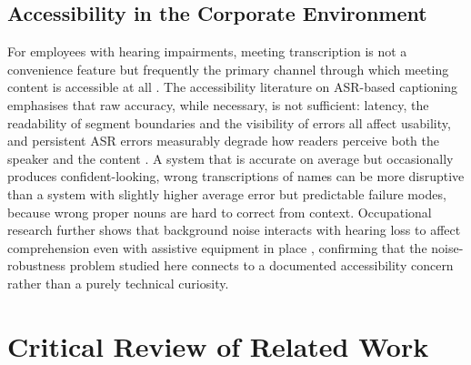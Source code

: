 \documentclass[12pt]{report}
\begin{document}
\subsection{Accessibility in the Corporate Environment}
For employees with hearing impairments, meeting transcription is not a convenience feature but frequently the primary channel through which meeting content is accessible at all \cite{marsja2025digital}. The accessibility literature on ASR-based captioning emphasises that raw accuracy, while necessary, is not sufficient: latency, the readability of segment boundaries and the visibility of errors all affect usability, and persistent ASR errors measurably degrade how readers perceive both the speaker and the content \cite{kadoma2026lost}. A system that is accurate on average but occasionally produces confident-looking, wrong transcriptions of names can be more disruptive than a system with slightly higher average error but predictable failure modes, because wrong proper nouns are hard to correct from context. Occupational research further shows that background noise interacts with hearing loss to affect comprehension even with assistive equipment in place \cite{giguere2010modelling,gygi2016background}, confirming that the noise-robustness problem studied here connects to a documented accessibility concern rather than a purely technical curiosity.
\section{Critical Review of Related Work}
\end{document}

